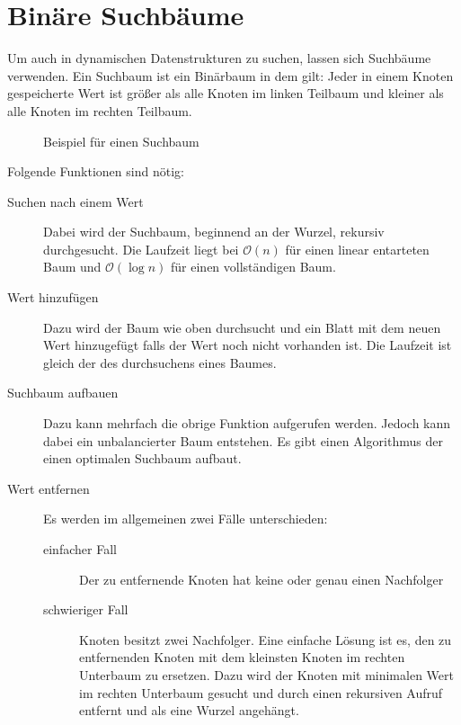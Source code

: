 \section{Binäre Suchbäume}
Um auch in dynamischen Datenstrukturen zu suchen, lassen sich Suchbäume verwenden.
Ein Suchbaum ist ein Binärbaum in dem gilt: Jeder in einem Knoten gespeicherte Wert ist größer als alle Knoten im linken Teilbaum und kleiner als alle Knoten im rechten Teilbaum.
\begin{figure}[htbp]
	\begin{center}
	\end{center}
	\label{img:SuchBaum}
	\caption{Beispiel für einen Suchbaum}
\end{figure}
Folgende Funktionen sind nötig:
\begin{description}
	\item[Suchen nach einem Wert] Dabei wird der Suchbaum, beginnend an der Wurzel, rekursiv durchgesucht.
		Die Laufzeit liegt bei \(\mathcal{O}(n)\) für einen linear entarteten Baum und \(\mathcal{O}(\log n)\) für einen vollständigen Baum.
	\item[Wert hinzufügen] Dazu wird der Baum wie oben durchsucht und ein Blatt mit dem neuen Wert hinzugefügt falls der Wert noch nicht vorhanden ist.
		Die Laufzeit ist gleich der des durchsuchens eines Baumes.
	\item[Suchbaum aufbauen] Dazu kann mehrfach die obrige Funktion aufgerufen werden.
		Jedoch kann dabei ein unbalancierter Baum entstehen.
		Es gibt einen Algorithmus der einen optimalen Suchbaum aufbaut.
	\item[Wert entfernen] Es werden im allgemeinen zwei Fälle unterschieden:
		\begin{description}
			\item[einfacher Fall] Der zu entfernende Knoten hat keine oder genau einen Nachfolger
			\item[schwieriger Fall] Knoten besitzt zwei Nachfolger.
				Eine einfache Lösung ist es, den zu entfernenden Knoten mit dem kleinsten Knoten im rechten Unterbaum zu ersetzen.
				Dazu wird der Knoten mit minimalen Wert im rechten Unterbaum gesucht und durch einen rekursiven Aufruf entfernt und als eine Wurzel angehängt.
		\end{description}
\end{description}


